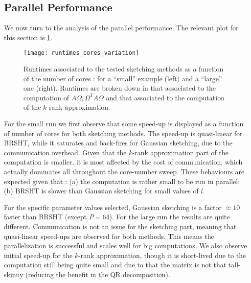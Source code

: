 \documentclass[a4paper, 12pt,oneside]{article}
\begin{document}
        \subsection{Parallel Performance}
			We now turn to the analysis of the parallel performance. The relevant plot for this section is \ref{fig:runtimes-cores-variation}. 
			\begin{figure}[htb]       
				\centering             
					\vspace{0em}
					\texttt{[image: runtimes\_cores\_variation]}
					\caption{Runtimes associated to the tested sketching methods as a function of the number of cores : for a ``small'' example (left) and a ``large'' one (right). Runtimes are broken down in that associated to the computation of $A\Omega,\Omega^T A\Omega$ and that associated to the computation of the $k$ rank approximation.}
					\label{fig:runtimes-cores-variation}
			\end{figure}
			For the small run we first observe that some speed-up is displayed as a function of number of cores for both sketching methods. The speed-up is quasi-linear for BRSHT, while it saturates and back-fires for Gaussian sketching, due to the communication overhead. Given that the $k$-rank approximation part of the computation is smaller, it is most affected by the cost of communication, which actually dominates all throughout the core-number sweep.   
			These behaviours are expected given that : (a) the computation is rather small to be run in parallel; (b) BRSHT is slower than Gaussian sketching for small values of $l$. 
			
			For the specific parameter values selected, Gaussian sketching is a factor $\approx 10$ faster than BRSHT (except $P=64$).
			For the large run the results are quite different. Communication is not an issue for the sketching part, meaning that quasi-linear speed-ups are observed for both methods. This means the parallelization is successful and scales well for big computations. We also observe initial speed-up for the $k$-rank approximation, though it is short-lived due to the computation still being quite small and due to that the matrix is not that tall-skinny (reducing the benefit in the QR decomposition). 
\end{document}
